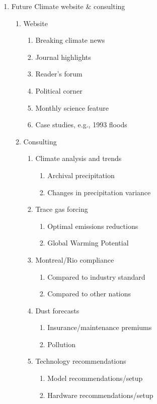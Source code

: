 \documentclass[final,dvips]{foils}
\begin{document}
\raggedright %

\foilhead{%
\Large\textcolor{blue}{\hfill Opportunities \hfill}}\vspace{-0.5in}\large
\begin{enumerate}
\item Future Climate website \& consulting 
\begin{enumerate}
\item Website
\begin{enumerate}
\item Breaking climate news
\item Journal highlights
\item Reader's forum
\item Political corner
\item Monthly science feature
\item Case studies, e.g., 1993 floods
\end{enumerate}

\clearpage
\item Consulting
\begin{enumerate}
\item Climate analysis and trends
\begin{enumerate}
\item Archival precipitation
\item Changes in precipitation variance 
\end{enumerate}
\item Trace gas forcing
\begin{enumerate}
\item Optimal emissions reductions
\item Global Warming Potential
\end{enumerate}
\item Montreal/Rio compliance
\begin{enumerate}
\item Compared to industry standard
\item Compared to other nations
\end{enumerate}
\item Dust forecasts
\begin{enumerate}
\item Insurance/maintenance premiums
\item Pollution
\end{enumerate}
\item Technology recommendations
\begin{enumerate}
\item Model recommendations/setup
\item Hardware recommendations/setup
\end{enumerate}
\end{enumerate}
\end{enumerate}
\end{enumerate}
\end{document}
